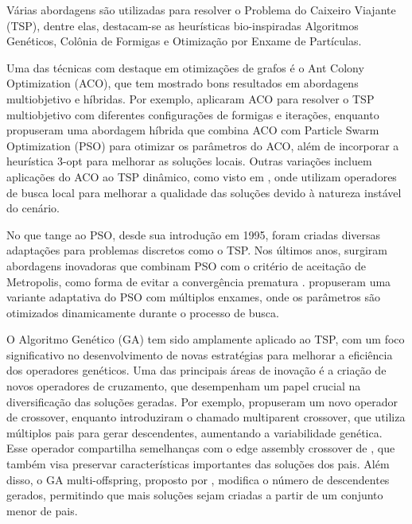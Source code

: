 \documentclass[
	12pt,				%
	openright,			%
	oneside,			%
	a4paper,			%
	chapter=TITLE,		%
	subsection=TITLE,	%
	english,			%
	brazil,				%
	]{abntex2}
\begin{document}
Várias abordagens são utilizadas para resolver o Problema do Caixeiro Viajante (TSP), dentre elas, destacam-se as heurísticas bio-inspiradas Algoritmos Genéticos, Colônia de Formigas e Otimização por Enxame de Partículas.

Uma das técnicas com destaque em otimizações de grafos é o Ant Colony Optimization (ACO), que tem mostrado bons resultados em abordagens multiobjetivo e híbridas. Por exemplo, \cite{ariyasingha2015performance} aplicaram ACO para resolver o TSP multiobjetivo com diferentes configurações de formigas e iterações, enquanto \cite{mahi2015new} propuseram uma abordagem híbrida que combina ACO com Particle Swarm Optimization (PSO) para otimizar os parâmetros do ACO, além de incorporar a heurística 3-opt para melhorar as soluções locais. Outras variações incluem aplicações do ACO ao TSP dinâmico, como visto em \cite{mavrovouniotis2016ant}, onde utilizam operadores de busca local para melhorar a qualidade das soluções devido à natureza instável do cenário.

No que tange ao PSO, desde sua introdução em 1995, foram criadas diversas adaptações para problemas discretos como o TSP. Nos últimos anos, surgiram abordagens inovadoras que combinam PSO com o critério de aceitação de Metropolis, como forma de evitar a convergência prematura \cite{zhong2018discrete}. \cite{marinakis2015adaptive} propuseram uma variante adaptativa do PSO com múltiplos enxames, onde os parâmetros são otimizados dinamicamente durante o processo de busca.

O Algoritmo Genético (GA) tem sido amplamente aplicado ao TSP, com um foco significativo no desenvolvimento de novas estratégias para melhorar a eficiência dos operadores genéticos. Uma das principais áreas de inovação é a criação de novos operadores de cruzamento, que desempenham um papel crucial na diversificação das soluções geradas. Por exemplo, \cite{hussain2020simulated} propuseram um novo operador de crossover, enquanto \cite{roy2019novel} introduziram o chamado multiparent crossover, que utiliza múltiplos pais para gerar descendentes, aumentando a variabilidade genética. Esse operador compartilha semelhanças com o edge assembly crossover de \cite{sakai2018edge}, que também visa preservar características importantes das soluções dos pais. Além disso, o GA multi-offspring, proposto por \cite{wang2016multi}, modifica o número de descendentes gerados, permitindo que mais soluções sejam criadas a partir de um conjunto menor de pais.

\end{document}
